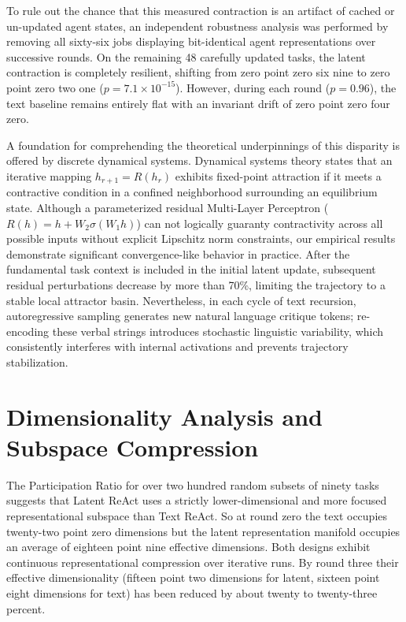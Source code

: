 \documentclass[a4paper, 12pt]{report}
\begin{document}
To rule out the chance that this measured contraction is an artifact of cached or un-updated agent states, an independent robustness analysis was performed by removing all sixty-six jobs displaying bit-identical agent representations over successive rounds. On the remaining 48 carefully updated tasks, the latent contraction is completely resilient, shifting from zero point zero six nine to zero point zero two one ($p = 7.1 \times 10^{-15}$). However, during each round ($p = 0.96$), the text baseline remains entirely flat with an invariant drift of zero point zero four zero.

A foundation for comprehending the theoretical underpinnings of this disparity is offered by discrete dynamical systems. Dynamical systems theory states that an iterative mapping $h_{r+1} = R(h_r)$ exhibits fixed-point attraction if it meets a contractive condition in a confined neighborhood surrounding an equilibrium state. Although a parameterized residual Multi-Layer Perceptron ($R(h) = h + W_2 \sigma(W_1 h)$) can not logically guaranty contractivity across all possible inputs without explicit Lipschitz norm constraints, our empirical results demonstrate significant convergence-like behavior in practice. After the fundamental task context is included in the initial latent update, subsequent residual perturbations decrease by more than 70\%, limiting the trajectory to a stable local attractor basin. Nevertheless, in each cycle of text recursion, autoregressive sampling generates new natural language critique tokens; re-encoding these verbal strings introduces stochastic linguistic variability, which consistently interferes with internal activations and prevents trajectory stabilization.

\section{Dimensionality Analysis and Subspace Compression}
The Participation Ratio for over two hundred random subsets of ninety tasks suggests that Latent ReAct uses a strictly lower-dimensional and more focused representational subspace than Text ReAct. So at round zero the text occupies twenty-two point zero dimensions but the latent representation manifold occupies an average of eighteen point nine effective dimensions. Both designs exhibit continuous representational compression over iterative runs. By round three their effective dimensionality (fifteen point two dimensions for latent, sixteen point eight dimensions for text) has been reduced by about twenty to twenty-three percent.
\end{document}
